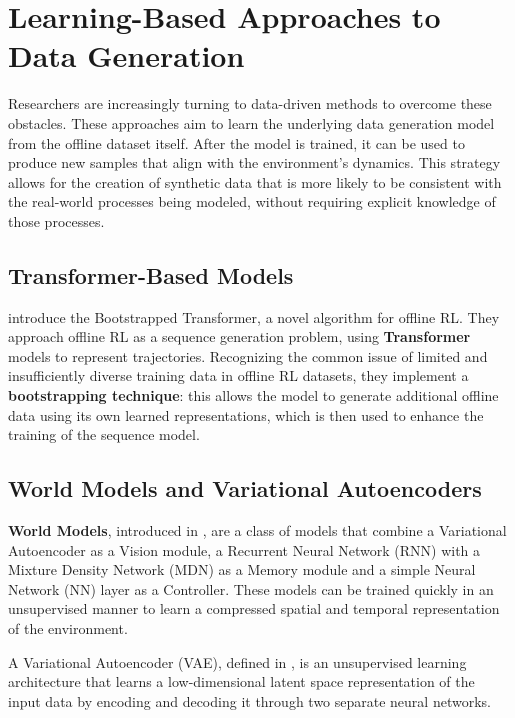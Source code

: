 \section{Learning-Based Approaches to Data Generation}

Researchers are increasingly turning to data-driven methods
to overcome these obstacles. These approaches aim to learn
the underlying data generation model from the offline
dataset itself. After the model is trained,
it can be used to produce new samples that align
with the environment's dynamics. This strategy allows
for the creation of synthetic data that is more likely
to be consistent with the real-world processes
being modeled, without requiring explicit knowledge
of those processes.

\subsection{Transformer-Based Models}

\cite{wang2022} introduce the Bootstrapped Transformer,
a novel algorithm for offline RL.
They approach offline RL as a sequence generation
problem, using \textbf{Transformer} models to represent
trajectories. Recognizing the common issue of
limited and insufficiently diverse training
data in offline RL datasets, they implement a
\textbf{bootstrapping technique}: 
this allows the model to generate additional
offline data using its own learned representations,
which is then used to enhance the training of
the sequence model.

\subsection{World Models and Variational Autoencoders}

\textbf{World Models}, introduced in \cite{ha2018},
are a class of models that combine a Variational
Autoencoder as a Vision module,
a Recurrent Neural Network (RNN)
with a Mixture Density Network (MDN) as a Memory
module and a simple Neural Network (NN)
layer as a Controller.
These models can be trained
quickly in an unsupervised manner to learn a
compressed spatial and temporal representation
of the environment.

A Variational Autoencoder (VAE),
defined in \cite{kingma2013},
is an unsupervised learning architecture
that learns a low-dimensional latent space
representation of the input data
by encoding and decoding it through
two separate neural networks.

